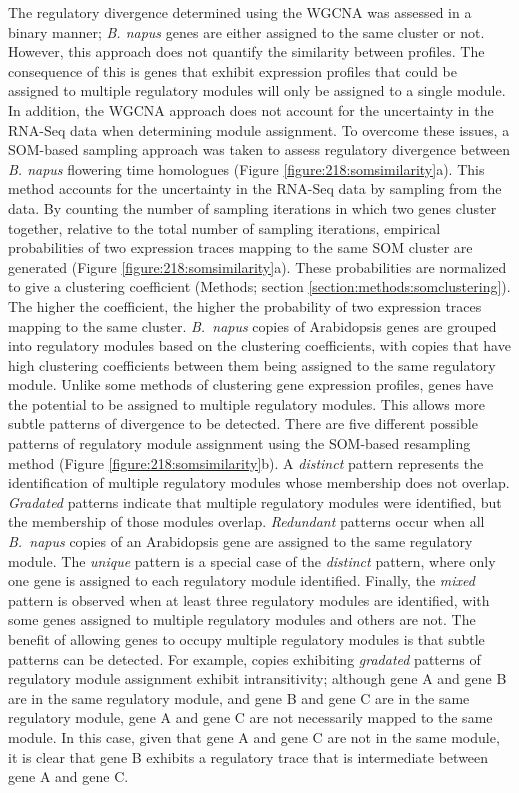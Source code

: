 \documentclass[12pt,]{book}
\begin{document}
The regulatory divergence determined using the WGCNA was assessed in a
binary manner; \emph{B. napus} genes are either assigned to the same
cluster or not. However, this approach does not quantify the similarity
between profiles. The consequence of this is genes that exhibit
expression profiles that could be assigned to multiple regulatory
modules will only be assigned to a single module. In addition, the WGCNA
approach does not account for the uncertainty in the RNA-Seq data when
determining module assignment. To overcome these issues, a SOM-based
sampling approach was taken to assess regulatory divergence between
\emph{B. napus} flowering time homologues (Figure
\ref{figure:218:somsimilarity}a). This method accounts for the
uncertainty in the RNA-Seq data by sampling from the data. By counting
the number of sampling iterations in which two genes cluster together,
relative to the total number of sampling iterations, empirical
probabilities of two expression traces mapping to the same SOM cluster
are generated (Figure \ref{figure:218:somsimilarity}a). These
probabilities are normalized to give a clustering coefficient (Methods;
section \ref{section:methods:somclustering}). The higher the
coefficient, the higher the probability of two expression traces mapping
to the same cluster. \emph{B.~napus} copies of Arabidopsis genes are
grouped into regulatory modules based on the clustering coefficients,
with copies that have high clustering coefficients between them being
assigned to the same regulatory module. Unlike some methods of
clustering gene expression profiles, genes have the potential to be
assigned to multiple regulatory modules. This allows more subtle
patterns of divergence to be detected. There are five different possible
patterns of regulatory module assignment using the SOM-based resampling
method (Figure \ref{figure:218:somsimilarity}b). A \emph{distinct}
pattern represents the identification of multiple regulatory modules
whose membership does not overlap. \emph{Gradated} patterns indicate
that multiple regulatory modules were identified, but the membership of
those modules overlap. \emph{Redundant} patterns occur when all
\emph{B.~napus} copies of an Arabidopsis gene are assigned to the same
regulatory module. The \emph{unique} pattern is a special case of the
\emph{distinct} pattern, where only one gene is assigned to each
regulatory module identified. Finally, the \emph{mixed} pattern is
observed when at least three regulatory modules are identified, with
some genes assigned to multiple regulatory modules and others are not.
The benefit of allowing genes to occupy multiple regulatory modules is
that subtle patterns can be detected. For example, copies exhibiting
\emph{gradated} patterns of regulatory module assignment exhibit
intransitivity; although gene A and gene B are in the same regulatory
module, and gene B and gene C are in the same regulatory module, gene A
and gene C are not necessarily mapped to the same module. In this case,
given that gene A and gene C are not in the same module, it is clear
that gene B exhibits a regulatory trace that is intermediate between
gene A and gene C.
\end{document}
